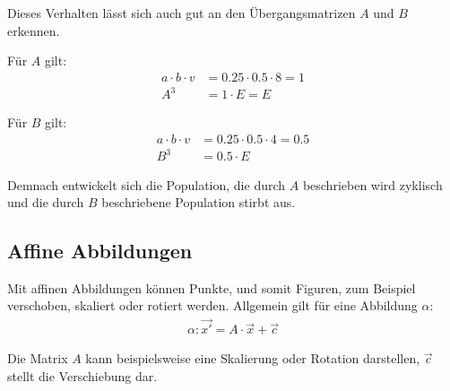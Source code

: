 \begin{flushleft}
Dieses Verhalten lässt sich auch gut an den Übergangsmatrizen $A$ und $B$ erkennen.

Für $A$ gilt:
\begin{align}
    a\cdot b\cdot v&=0.25\cdot 0.5\cdot 8=1 \\
    A^3&=1\cdot E=E
\end{align}

Für $B$ gilt:
\begin{align}
    a\cdot b\cdot v&=0.25\cdot 0.5\cdot 4=0.5 \\
    B^3&=0.5\cdot E
\end{align}

Demnach entwickelt sich die Population, die durch $A$ beschrieben wird zyklisch
und die durch $B$ beschriebene Population stirbt aus.
\end{flushleft}

\subsection{Affine Abbildungen}
\begin{flushleft}
Mit affinen Abbildungen können Punkte, und somit Figuren, zum Beispiel verschoben, skaliert oder rotiert werden.
Allgemein gilt für eine Abbildung $\alpha$:
\begin{align}
    \alpha\colon \vec{x'}=A\cdot\vec{x}+\vec{c}
\end{align}

Die Matrix $A$ kann beispielsweise eine Skalierung oder Rotation darstellen, $\vec{c}$ stellt die Verschiebung dar.
\end{flushleft}

\begin{center}
\end{center}
